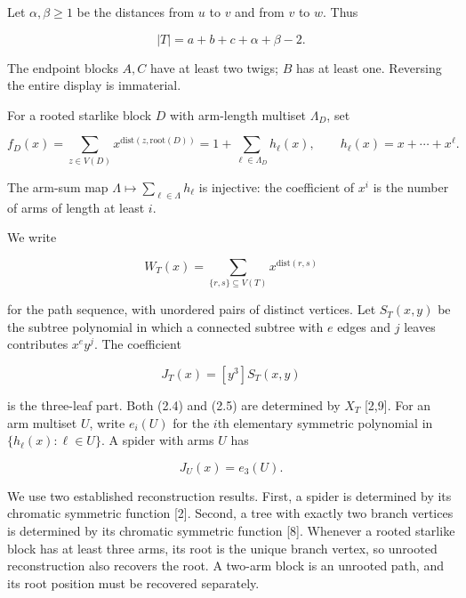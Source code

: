 \documentclass[11pt]{article}
\begin{document}
Let $\alpha,\beta\geq1$ be the distances from $u$ to $v$ and from $v$ to $w$. Thus

\begin{equation*}
|T|=a+b+c+\alpha+\beta-2.
\tag{2.2}
\end{equation*}


The endpoint blocks $A,C$ have at least two twigs; $B$ has at least one. Reversing the entire
display is immaterial.

For a rooted starlike block $D$ with arm-length multiset $\Lambda_D$, set

\begin{equation*}
f_D(x)=\sum_{z\in V(D)}x^{\mathrm{dist}(z,\mathrm{root}(D))}
      =1+\sum_{\ell\in\Lambda_D}h_\ell(x),
\qquad h_\ell(x)=x+\cdots+x^\ell.
\tag{2.3}
\end{equation*}


The arm-sum map $\Lambda\mapsto\sum_{\ell\in\Lambda}h_\ell$ is injective: the coefficient of
$x^i$ is the number of arms of length at least $i$.

We write

\begin{equation*}
W_T(x)=\sum_{\{r,s\}\subseteq V(T)}x^{\mathrm{dist}(r,s)}
\tag{2.4}
\end{equation*}


for the path sequence, with unordered pairs of distinct vertices. Let $S_T(x,y)$ be the subtree
polynomial in which a connected subtree with $e$ edges and $j$ leaves contributes $x^e y^j$.
The coefficient

\begin{equation*}
J_T(x)=[y^3]S_T(x,y)
\tag{2.5}
\end{equation*}


is the three-leaf part. Both (2.4) and (2.5) are determined by $X_T$ [2,9]. For an arm multiset
$U$, write $e_i(U)$ for the $i$th elementary symmetric polynomial in
$\{h_\ell(x):\ell\in U\}$. A spider with arms $U$ has

\begin{equation*}
J_U(x)=e_3(U).
\tag{2.6}
\end{equation*}


We use two established reconstruction results. First, a spider is determined by its chromatic
symmetric function [2]. Second, a tree with exactly two branch vertices is determined by its
chromatic symmetric function [8]. Whenever a rooted starlike block has at least three arms, its
root is the unique branch vertex, so unrooted reconstruction also recovers the root. A two-arm
block is an unrooted path, and its root position must be recovered separately.
\end{document}
